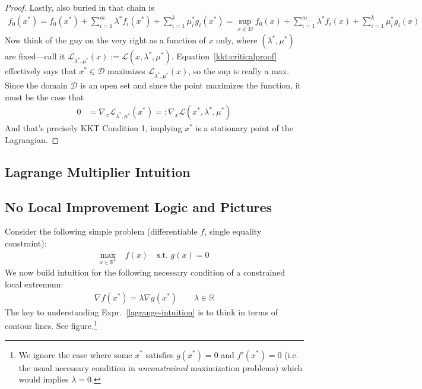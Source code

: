 \documentclass[12pt]{book}
\numberwithin{equation}{section} %
\theoremstyle{plain}
\theoremstyle{definition}
\theoremstyle{remark}
\newcommand{\sL}{\mathscr{L}}
\newcommand{\R}{\mathbb{R}}
\begin{document}
\begin{proof}
Lastly, also buried in that chain is
\begin{align}
  f_0(x^*)
  = f_0(x^*) + \sum^m_{i=1} \lambda^* f_i(x^*)
  + \sum^k_{i=1} \mu_i^* g_i(x^*)
  = \sup_{x\in D} f_0(x) + \sum^m_{i=1} \lambda^* f_i(x)
  + \sum^k_{i=1} \mu_i^* g_i(x)
  \label{kkt:criticalproof}
\end{align}
Now think of the guy on the very right as a function of $x$ only, where
$(\lambda^*,\mu^*)$ are fixed---call it
$\sL_{\lambda^*,\mu^*}(x):=\sL(x,\lambda^*,\mu^*)$.
Equation~\ref{kkt:criticalproof} effectively says that
$x^*\in\mathcal{D}$ maximizes $\sL_{\lambda^*,\mu^*}(x)$, so the sup is
really a max. Since the domain $\mathcal{D}$ is an open set and since
the point maximizes the function, it must be the case that
\begin{align*}
  0 &= \nabla_x \sL_{\lambda^*,\mu^*}(x^*)
  =:
  \nabla_x \sL(x^*,\lambda^*,\mu^*)
\end{align*}
And that's precisely KKT Condition 1, implying $x^*$ is a stationary
point of the Lagrangian.
\end{proof}

\clearpage
\subsection{Lagrange Multiplier Intuition}

\subsection{No Local Improvement Logic and Pictures}

Consider the following simple problem (differentiable $f$, single
equality constraint):
\begin{align}
  \max_{x\in\R^k} &\;f(x)
  \quad
  \text{s.t. } g(x) = 0
  \label{prob:eqconst}
\end{align}
We now build intuition for the following necessary condition of a
constrained local extremum:
\begin{align}
  \nabla f(x^*) = \lambda \nabla g(x^*)
  \qquad \lambda \in \R
  \label{lagrange-intuition}
\end{align}
The key to understanding Expr.~\ref{lagrange-intuition} is
to think in terms of contour lines. See figure.\footnote{%
  We ignore the case where some $x^*$ satisfies $g(x^*)=0$ and
  $f'(x^*)=0$ (i.e. the usual necessary condition in
  \emph{unconstrained} maximization problems) which would implies
  $\lambda=0$.
}
\end{document}
